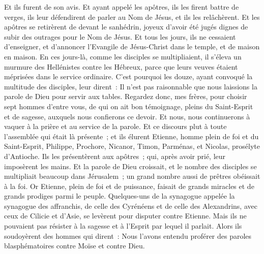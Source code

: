 \begin{multicols}{2}
Et ils furent de son avis. Et ayant appelé les apôtres, ils les firent battre de verges, ils leur défendirent de parler au Nom de Jésus, et ils les relâchèrent.
Et les apôtres se retirèrent de devant le sanhédrin, joyeux d'avoir été jugés dignes de subir des outrages pour le Nom de Jésus.
Et tous les jours, ils ne cessaient d'enseigner, et d'annoncer l'Evangile de Jésus-Christ dans le temple, et de maison en maison.
\VerseOne{}En ces jours-là, comme les disciples se multipliaient, il s'éleva un murmure des Hellénistes contre les Hébreux, parce que leurs veuves étaient méprisées dans le service ordinaire.
C'est pourquoi les douze, ayant convoqué la multitude des disciples, leur dirent~: Il n'est pas raisonnable que nous laissions la parole de Dieu pour servir aux tables.
Regardez donc, mes frères, pour choisir sept hommes d'entre vous, de qui on ait bon témoignage, pleins du Saint-Esprit et de sagesse, auxquels nous confierons ce devoir.
Et nous, nous continuerons à vaquer à la prière et au service de la parole.
Et ce discours plut à toute l'assemblée qui était là présente~; et ils élurent Etienne, homme plein de foi et du Saint-Esprit, Philippe, Prochore, Nicanor, Timon, Parménas, et Nicolas, prosélyte d'Antioche.
Ils les présentèrent aux apôtres~; qui, après avoir prié, leur imposèrent les mains.
Et la parole de Dieu croissait, et le nombre des disciples se multipliait beaucoup dans Jérusalem~; un grand nombre aussi de prêtres obéissait à la foi.
Or Etienne, plein de foi et de puissance, faisait de grands miracles et de grands prodiges parmi le peuple.
Quelques-uns de la synagogue appelée la synagogue des affranchis, de celle des Cyrénéens et de celle des Alexandrins, avec ceux de Cilicie et d'Asie, se levèrent pour disputer contre Etienne.
Mais ils ne pouvaient pas résister à la sagesse et à l'Esprit par lequel il parlait.
Alors ils soudoyèrent des hommes qui dirent~: Nous l'avons entendu proférer des paroles blasphématoires contre Moïse et contre Dieu.

\end{multicols}
